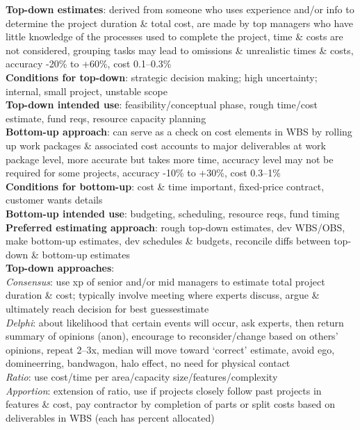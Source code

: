 \documentclass[a4paper]{article}
\begin{document}
\begin{multicols}{3}
        \textbf{Top-down estimates}: derived from someone who uses experience and/or info to determine the project duration \& total cost, are made by top managers who have little knowledge of the processes used to complete the project, time \& costs are not considered, grouping tasks may lead to omissions \& unrealistic times \& costs, accuracy -20\% to +60\%, cost 0.1--0.3\%\\
        \textbf{Conditions for top-down}: strategic decision making; high uncertainty; internal, small project, unstable scope\\
        \textbf{Top-down intended use}: feasibility/conceptual phase, rough time/cost estimate, fund reqs, resource capacity planning\\
        \textbf{Bottom-up approach}: can serve as a check on cost elements in WBS by rolling up work packages \& associated cost accounts to major deliverables at work package level, more accurate but takes more time, accuracy level may not be required for some projects, accuracy -10\% to +30\%, cost 0.3--1\%\\
        \textbf{Conditions for bottom-up}: cost \& time important, fixed-price contract, customer wants details\\
        \textbf{Bottom-up intended use}: budgeting, scheduling, resource reqs, fund timing\\
        \textbf{Preferred estimating approach}: rough top-down estimates, dev WBS/OBS, make bottom-up estimates, dev schedules \& budgets, reconcile diffs between top-down \& bottom-up estimates\\
        \textbf{Top-down approaches}:\\
        \textit{Consensus}: use xp of senior and/or mid managers to estimate total project duration \& cost; typically involve meeting where experts discuss, argue \& ultimately reach decision for best guessestimate\\
        \textit{Delphi}: about likelihood that certain events will occur, ask experts, then return summary of opinions (anon), encourage to reconsider/change based on others' opinions, repeat 2--3x, median will move toward `correct' estimate, avoid ego, domineerring, bandwagon, halo effect, no need for physical contact\\
        \textit{Ratio}: use cost/time per area/capacity size/features/complexity\\
        \textit{Apportion}: extension of ratio, use if projects closely follow past projects in features \& cost, pay contractor by completion of parts or split costs based on deliverables in WBS (each has percent allocated)\\

\end{multicols}
\end{document}
